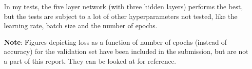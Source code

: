 \documentclass[12pt, a4paper]{article}
\begin{document}
\begin{itemize}
In my tests, the five layer network (with three hidden layers) performs the best, but the tests are subject to a lot of other hyperparameters not tested, like the learning rate, batch size and the number of epochs.

\textbf{Note}: Figures depicting loss as a function of number of epochs (instead of accuracy) for the validation set have been included in the submission, but are not a part of this report. They can be looked at for reference.

\end{itemize}



\end{document}
